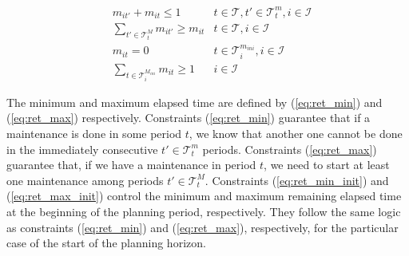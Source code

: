 \documentclass[a4paper,onecolumn,fleqn]{article}
\begin{document}
    \begin{align}
        & m_{it'} + m_{it} \leq 1
          & t \in \mathcal{T}, t' \in \mathcal{T}^{m}_t, i \in \mathcal{I}\label{eq:ret_min}\\ 
        & \sum_{t' \in \mathcal{T}^{M}_t} m_{it'} \geq  m_{it}
          & t \in \mathcal{T}, i \in \mathcal{I}\label{eq:ret_max}\\
        & m_{it} = 0
          & t \in \mathcal{T}^{m_{ini}}_i, i \in \mathcal{I}\label{eq:ret_min_init} \\
        & \sum_{t \in \mathcal{T}^{M_{ini}}_i} m_{it} \geq  1 
          & i \in \mathcal{I}\label{eq:ret_max_init}
    \end{align}

    The minimum and maximum elapsed time are defined by (\ref{eq:ret_min}) and (\ref{eq:ret_max}) respectively. Constraints (\ref{eq:ret_min}) guarantee that if a maintenance is done in some period $t$, we know that another one cannot be done in the immediately consecutive $t' \in \mathcal{T}^{m}_t$ periods. Constraints (\ref{eq:ret_max}) guarantee that, if we have a maintenance in period $t$, we need to start at least one maintenance among periods $t' \in \mathcal{T}^{M}_t$. Constraints (\ref{eq:ret_min_init}) and (\ref{eq:ret_max_init}) control the minimum and maximum remaining elapsed time at the beginning of the planning period, respectively. They follow the same logic as constraints (\ref{eq:ret_min}) and (\ref{eq:ret_max}), respectively, for the particular case of the start of the planning horizon.

\end{document}
